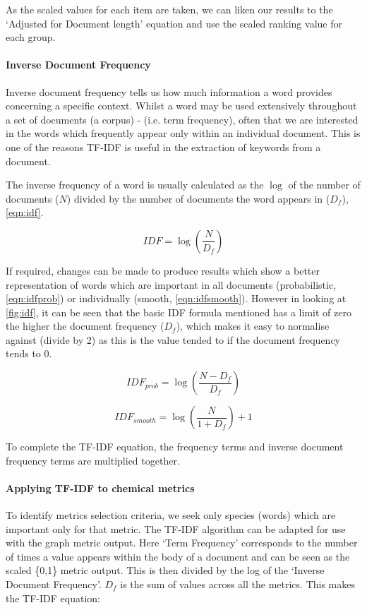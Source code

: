 As the scaled values for each item are taken, we can liken our results to the `Adjusted for Document length' equation and use the scaled ranking value for each group.

\paragraph*{Inverse Document Frequency}
Inverse document frequency tells us how much information a word provides concerning a specific context. Whilst a word may be used extensively throughout a set of documents (a corpus) -  (i.e. term frequency), often that we are interested in the words which frequently appear only within an individual document. This is one of the reasons TF-IDF is useful in the extraction of keywords from a document. 

The inverse frequency of a word is usually calculated as the $\log$ of the number of documents ($N$) divided by the number of documents the word appears in ($D_f$), \autoref{eqn:idf}.


\begin{equation}
    IDF = \log(\frac{N}{D_f})
    \label{eqn:idf}
\end{equation}

If required, changes can be made to produce results which show a better representation of words which are important in all documents (probabilistic, \autoref{eqn:idfprob}) or individually (smooth, \autoref{eqn:idfsmooth}). However in looking at \autoref{fig:idf}, it can be seen that the basic IDF formula mentioned has a limit of zero the higher the document frequency ($D_f$), which makes it easy to normalise against (divide by 2) as this is the value tended to if the document frequency tends to 0.    


\begin{equation}
    IDF_{prob} = \log(\frac{N-D_f}{D_f})
    \label{eqn:idfprob}
\end{equation}

\begin{equation}
    IDF_{smooth} = \log(\frac{N}{1+D_f})+1
    \label{eqn:idfsmooth}
\end{equation}




To complete the TF-IDF equation, the frequency terms and inverse document frequency terms are multiplied together. 

\paragraph*{Applying TF-IDF to chemical metrics}
To identify metrics selection criteria, we seek only species (words) which are important only for that metric. The TF-IDF algorithm can be adapted for use with the graph metric output. Here `Term Frequency' corresponds to the number of times a value appears within the body of a document and can be seen as the scaled \{0,1\} metric output. This is then divided by the log of the `Inverse Document Frequency'.  $D_f$ is the sum of values across all the metrics. This makes the TF-IDF equation: 

